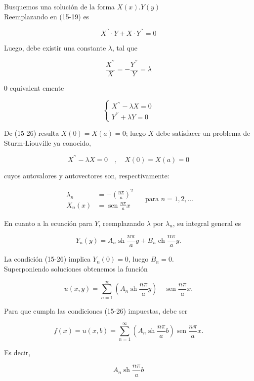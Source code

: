 \documentclass[10pt]{article}
\theoremstyle{plain}
\theoremstyle{definition}
\theoremstyle{remark}
\begin{document}
Busquemos una solución de la forma $X(x) . Y(y)$\\
Reemplazando en (15-19) es

$$
X^{\prime \prime} \cdot Y+X \cdot Y^{\prime \prime}=0
$$

Luego, debe existir una constante $\lambda$, tal que

$$
\frac{X^{\prime \prime}}{X}=-\frac{Y^{\prime \prime}}{Y}=\lambda
$$

0 equivalent emente

$$
\left\{\begin{array}{l}
X^{\prime \prime}-\lambda X=0 \\
Y^{\prime \prime}+\lambda Y=0
\end{array}\right.
$$

De (15-26) resulta $X(0)=X(a)=0$; luego $X$ debe satisfacer un problema de Sturm-Liouville ya conocido,

$$
X^{\prime \prime}-\lambda X=0 \quad, \quad X(0)=X(a)=0
$$

cuyos autovalores y autovectores son, respectivamente:

$$
\begin{aligned}
\lambda_{n} & =-\left(\frac{n \pi}{a}\right)^{2} \\
X_{n}(x) & =\operatorname{sen} \frac{n \pi}{a} x
\end{aligned} \quad \text { para } n=1,2, \ldots
$$

En cuanto a la ecuación para $Y$, reemplazando $\lambda$ por $\lambda_{n}$, su integral general es

$$
Y_{n}(y)=A_{n} \operatorname{sh} \frac{n \pi}{a} y+B_{n} \operatorname{ch} \frac{n \pi}{a} y .
$$

La condición (15-26) implica $Y_{n}(0)=0$, luego $B_{n}=0$.\\
Superponiendo soluciones obtenemos la función


\begin{equation*}
u(x, y)=\sum_{n=1}^{\infty}\left(A_{n} \operatorname{sh} \frac{n \pi}{a} y\right) \quad \operatorname{sen} \frac{n \pi}{a} x . \tag{15-27}
\end{equation*}


Para que cumpla las condiciones (15-26) impuestas, debe ser

$$
f(x)=u(x, b)=\sum_{n=1}^{\infty}\left(A_{n} \operatorname{sh} \frac{n \pi}{a} b\right) \operatorname{sen} \frac{n \pi}{a} x .
$$

Es decir,

$$
A_{n} \operatorname{sh} \frac{n \pi}{a} b
$$
\end{document}
